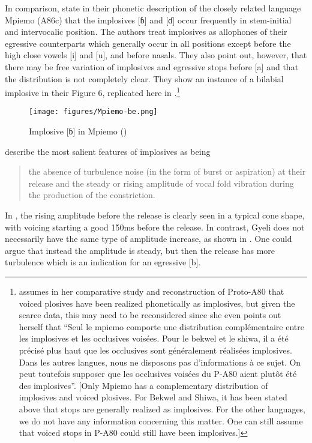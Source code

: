 In comparison, \citet[173]{thornell2004} state in their phonetic description of the closely related language Mpiemo (A86c) that the implosives [ɓ] and [ɗ] occur frequently in stem-initial and intervocalic position. The authors treat implosives as allophones of their egressive counterparts which generally occur in all positions except before the high close vowels [i] and [u], and before nasals. They also point out, however, that there may be free variation of implosives and egressive stops before [a] and that the distribution is not completely clear.  They show an instance of a bilabial implosive in their Figure 6, replicated here in .\footnote{\citet[461]{cheucle2014} assumes in her comparative study and reconstruction of Proto-A80 that voiced plosives have been realized phonetically as implosives, but given the scarce data, this may need to be reconsidered since she even points out herself that ``Seul le mpiemo comporte une distribution complémentaire entre les implosives et les occlusives voisées. Pour le bekwel et le shiwa, il a été précisé plus haut que les occlusives sont généralement réalisées implosives. Dans les autres langues, nous ne disposons pas d’informations à ce sujet. On peut toutefois supposer que les occlusives voisées du P-A80 aient plutôt été des implosives''. [Only Mpiemo has a complementary distribution of implosives and voiced plosives. For Bekwel and Shiwa, it has been stated above that stops are generally realized as implosives. For the other languages, we do not have any information concerning this matter. One can still assume that voiced stops in P-A80 could still have been implosives.]}


\begin{figure}
\texttt{[image: figures/Mpiemo-be.png]}
\caption{Implosive [ɓ] in Mpiemo (\citet[172]{thornell2004})}
\label{Fig:mpiemo}
\end{figure}

\citet[312]{clements2002} describe the most salient features of implosives as being
\begin{quote}
the absence of turbulence noise (in the form of burst or aspiration) at their release and the steady or rising amplitude of vocal fold vibration during the production of the constriction.
\end{quote}

In , the rising amplitude before the release is clearly seen in a typical cone shape, with voicing starting a good 150ms before the release. In contrast, Gyeli does not necessarily have the same type of amplitude increase, as shown in . One could argue that instead the amplitude is steady, but then the release has more turbulence which is an indication for an egressive [b].



